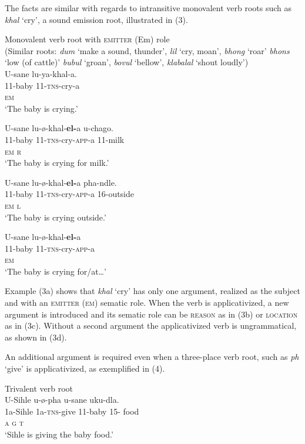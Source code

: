 \documentclass[output=paper]{langsci/langscibook}
\begin{document}
 The facts are similar with regards to intransitive monovalent verb roots such as \textit{khal} ‘cry’, a sound emission root, illustrated in (3). 

\ea
{Monovalent verb root with \textsc{emitter} (Em) role}\\
 (Similar roots: \textit{dum} ‘make a sound, thunder’, \textit{lil }‘cry, moan’, \textit{bhong} ‘roar’ \textit{bhons} ‘low (of cattle)’ \textit{bubul} ‘groan’, \textit{bovul} ‘bellow’, \textit{klabalal} ‘shout loudly’)\\
\ea
\gll U-sane lu-ya-khal-a.\\
 11-baby 11-\textsc{tns}-cry-a \\
 \textsc{em}\\
\glt ‘The baby is crying.’

\ex
\gll U-sane lu-ø-khal-\textbf{el-}a u-chago. \\
 11-baby 11-\textsc{tns}-cry-\textsc{app}-a 11-milk\\
 \textsc{em r}\\
\glt ‘The baby is crying for milk.’ 

\ex
\gll U-sane lu-ø-khal-\textbf{el-}a pha-ndle.\\
 11-baby 11-\textsc{tns}-cry-\textsc{app}-a 16-outside\\
 \textsc{em l}\\
\glt ‘The baby is crying outside.’


\ex
\gll *U-sane lu-ø-khal-\textbf{el-}a \\
 11-baby 11-\textsc{tns}-cry-\textsc{app}-a \\
 \textsc{em} \\
\glt ‘The baby is crying for/at…’
\z
\z

Example (3a) shows that \textit{khal} ‘cry’ has only one argument, realized as the subject and with an \textsc{emitter} (\textsc{em}) sematic role. When the verb is applicativized, a new argument is introduced and its sematic role can be \textsc{reason} as in (3b) or \textsc{location} as in (3c). Without a second argument the applicativized verb is ungrammatical, as shown in (3d).

 An additional argument is required even when a three-place verb root, such as \textit{ph} ‘give’ is applicativized, as exemplified in (4). 

\ea
{Trivalent verb root}\\

\ea
\gll U-Sihle u-ø-pha u-sane uku-dla. \\
 1a-Sihle 1a-\textsc{tns}-give 11-baby 15- food \\
 \textsc{a g t}\\
\glt ‘Sihle is giving the baby food.’
\end{document}
